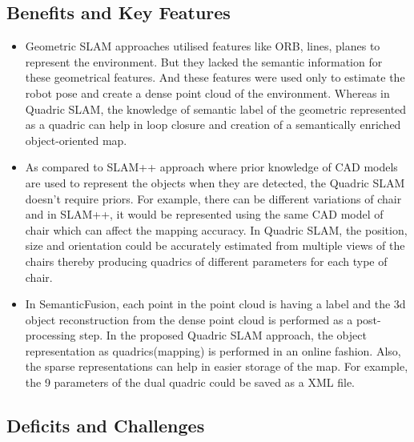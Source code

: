 \documentclass{article}
\begin{document}
\subsection{Benefits and Key Features}
\begin{itemize}
\item Geometric SLAM approaches utilised features like ORB\cite{orbslam}, lines\cite{linesegment}, planes\cite{infiniteplanes} to represent the environment. But they lacked the semantic information for these geometrical features. And these features were used only to estimate the robot pose and create a dense point cloud of the environment. Whereas in Quadric SLAM, the knowledge of semantic label of the geometric represented as a quadric can help in loop closure and creation of a semantically enriched object-oriented map.
\item As compared to SLAM++\cite{slam++} approach where prior knowledge of CAD models are used to represent the objects when they are detected, the Quadric SLAM doesn't require priors. For example, there can be different variations of chair and in SLAM++, it would be represented using the same CAD model of chair which can affect the mapping accuracy. In Quadric SLAM, the position, size and orientation could be accurately estimated from multiple views of the chairs thereby producing quadrics of different parameters for each type of chair.
\item In SemanticFusion\cite{semanticfusion}, each point in the point cloud is having a label and the 3d object reconstruction from the dense point cloud is performed as a post-processing step. In the proposed Quadric SLAM approach, the object representation as quadrics(mapping) is performed in an online fashion. Also, the sparse representations can help in easier storage of the map. For example, the 9 parameters of the dual quadric could be saved as a XML file.

\end{itemize}

\subsection{Deficits and Challenges}
\end{document}
